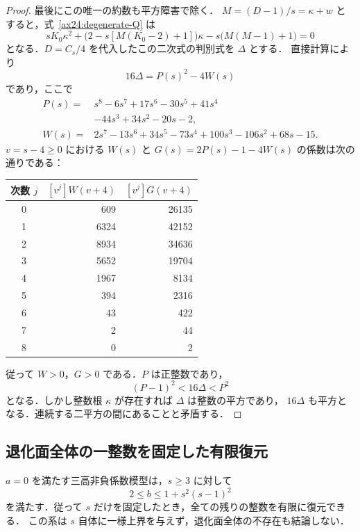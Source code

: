 \begin{proof}
最後にこの唯一の約数も平方障害で除く．
$M=(D-1)/s=\kappa+w$ とすると，式~\eqref{ax24:degenerate-Q} は
\begin{equation}\label{ax24:kappa-quadratic}
 sK_0\kappa^2+
 \bigl(2-s[M(K_0-2)+1]\bigr)\kappa
 -s\bigl(M(M-1)+1\bigr)=0
\end{equation}
となる．$D=C_s/4$ を代入したこの二次式の判別式を $\Delta$ とする．
直接計算により
\begin{equation}\label{ax24:square-gap}
 16\Delta=P(s)^2-4W(s)
\end{equation}
であり，ここで
\begin{align*}
 P(s)={}&s^8-6s^7+17s^6-30s^5+41s^4\\
        &-44s^3+34s^2-20s-2,\\
 W(s)={}&2s^7-13s^6+34s^5-73s^4+100s^3-106s^2+68s-15.
\end{align*}
$v=s-4\ge0$ における $W(s)$ と $G(s)=2P(s)-1-4W(s)$ の係数は次の通りである：
\begin{center}\small
\begin{tabular}{c|r|r}
次数 $j$ & $[v^j]W(v+4)$ & $[v^j]G(v+4)$\\\hline
0&609&26135\\
1&6324&42152\\
2&8934&34636\\
3&5652&19704\\
4&1967&8134\\
5&394&2316\\
6&43&422\\
7&2&44\\
8&0&2
\end{tabular}
\end{center}
従って $W>0$，$G>0$ である．$P$ は正整数であり，
\[
 (P-1)^2<16\Delta<P^2
\]
となる．しかし整数根 $\kappa$ が存在すれば $\Delta$ は整数の平方であり，
$16\Delta$ も平方となる．連続する二平方の間にあることと矛盾する．
\end{proof}

\subsection{退化面全体の一整数を固定した有限復元}

\begin{corollary}[退化面の低行一整数有限性]
\label{ax24:degenerate-finite}
$a=0$ を満たす三高非負係数模型は，$s\ge3$ に対して
\begin{equation}\label{ax24:uniform-b-bound}
 2\le b\le1+s^2(s-1)^2
\end{equation}
を満たす．従って $s$ だけを固定したとき，全ての残りの整数を有限に復元できる．
この系は $s$ 自体に一様上界を与えず，退化面全体の不存在も結論しない．
\end{corollary}

